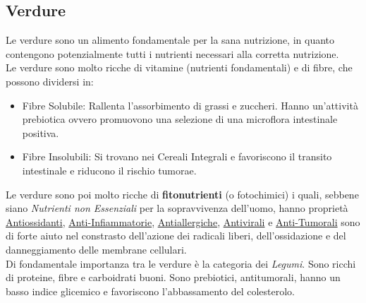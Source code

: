 \documentclass[../uefaC.tex]{subfiles}
\begin{document}
\subsection{Verdure}
Le verdure sono un alimento fondamentale per la sana nutrizione, in quanto contengono potenzialmente tutti i nutrienti necessari alla corretta nutrizione. \hfill \\
Le verdure sono molto ricche di vitamine (nutrienti fondamentali) e di fibre, che possono dividersi in:
\begin{itemize}
    \item Fibre Solubile: Rallenta l'assorbimento di grassi e zuccheri. Hanno un'attività prebiotica ovvero promuovono una selezione di una microflora intestinale positiva.
    \item Fibre Insolubili: Si trovano nei Cereali Integrali e favoriscono il transito intestinale e riducono il rischio tumorae.
\end{itemize}
Le verdure sono poi molto ricche di \textbf{fitonutrienti} (o fotochimici) i quali, sebbene siano \emph{Nutrienti non Essenziali} per la sopravvivenza dell'uomo, hanno proprietà \underline{Antiossidanti}, \underline{Anti-Infiammatorie}, \underline{Antiallergiche}, \underline{Antivirali} e \underline{Anti-Tumorali} sono di forte aiuto nel constrasto dell'azione dei radicali liberi, dell'ossidazione e del danneggiamento delle membrane cellulari. \hfill \\
Di fondamentale importanza tra le verdure è la categoria dei \emph{Legumi}. Sono ricchi di proteine, fibre e carboidrati buoni. Sono prebiotici, antitumorali, hanno un basso indice glicemico e favoriscono l'abbassamento del colesterolo. \hfill \\
\end{document}
